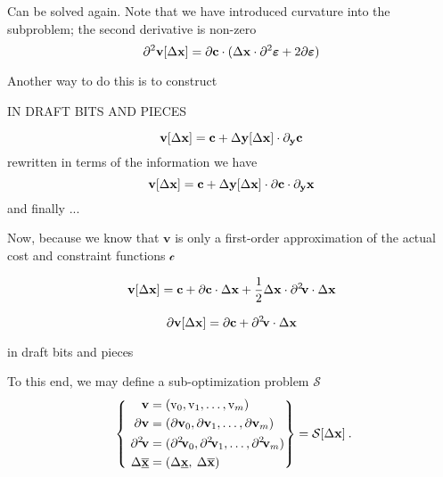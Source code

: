 \documentclass[11pt]{article}
\begin{document}
Can be solved again. Note that we have introduced curvature into the subproblem; the second derivative is non-zero
\begin{equation}
\partial^2 \textbf{v}[\Delta \mathbf{x}] = \partial \mathbf{c} \cdot ( \Delta \mathbf{x} \cdot \partial^2 \bm{\varepsilon} + 2 \partial \bm{\varepsilon})
\end{equation}

Another way to do this is to construct 


\newpage

IN DRAFT BITS AND PIECES

\begin{equation}
\textbf{v}[\Delta \mathbf{x}] = \mathbf{c} + \Delta \mathbf{y}[\Delta \mathbf{x}] \cdot \partial_{\mathbf{y}}\mathbf{c}
\end{equation}
rewritten in terms of the information we have
\begin{equation}
\textbf{v}[\Delta \mathbf{x}] = \mathbf{c} + \Delta \mathbf{y}[\Delta \mathbf{x}] \cdot \partial \mathbf{c} \cdot \partial_{\mathbf{y}} \mathbf{x}
\end{equation}
and finally ... 



Now, because we know that $\textbf{v}$ is only a first-order approximation of the actual cost and constraint functions $\mathcal{c}$


\begin{equation}
\textbf{v}[\Delta \mathbf{x}] = \mathbf{c} + \partial \mathbf{c} \cdot \Delta \mathbf{x} + \frac{1}{2} \Delta \mathbf{x} \cdot \partial^{2}\!\mathbf{v} \cdot \Delta \mathbf{x}
\end{equation}

\begin{equation}
\partial \textbf{v}[\Delta \mathbf{x}] =  \partial \mathbf{c} + \partial^{2}\!\mathbf{v} \cdot  \Delta \mathbf{x}
\end{equation}


\bigskip

in draft bits and pieces

\bigskip


To this end, we may define a sub-optimization problem $\mathcal{S}$
\begin{align}
\label{d:eqn:p}
 ~\left\{ ~
\begin{aligned}
\mathbf{v} &= (\textrm{v}_0, \textrm{v}_1, \ldots, \textrm{v}_m ) \\
\mathbf{\partial v} & = (\mathbf{\partial v}_0 , \mathbf{\partial v}_1 , \ldots,\mathbf{\partial v}_m  ) \\
\partial^{2}\!\mathbf{v} & = (\partial^2\!\mathbf{ v}_0 , \partial^2\!\mathbf{ v}_1 , \ldots,\partial^2\!\mathbf{ v}_m  ) \\
\Delta \underline{\overline{\mathbf{x}}} & = ( \Delta \underline{\mathbf{x}} , \: \Delta \overline{\mathbf{x}} ) \:
\end{aligned}\right\} =
\mathcal{S} [\Delta \mathbf{x}] \: .
\end{align}
\bigskip
\end{document}
